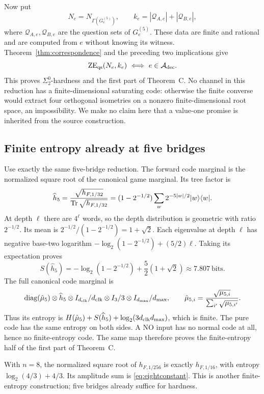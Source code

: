 Now put
\[
 N_e=N_{\Gamma(G_e^{(5)})},\qquad
 k_e=|\mathcal Q_{A,e}|+|\mathcal Q_{B,e}|,
\]
where $\mathcal Q_{A,e},\mathcal Q_{B,e}$ are the question sets of $G^{(5)}_e$. These data are finite and rational and are computed from $e$ without knowing its witness. Theorem~\ref{thm:correspondence} and the preceding two implications give
\[
 \mathrm{ZE}_{\mathrm{qs}}(N_e,k_e)\ \Longleftrightarrow\ e\in \mathcal A_{\rm dec}.
\]
This proves $\Sigma^0_2$-hardness and the first part of Theorem~C. No channel in this reduction has a finite-dimensional saturating code: otherwise the finite converse would extract four orthogonal isometries on a nonzero finite-dimensional root space, an impossibility. We make no claim here that a value-one promise is inherited from the source construction.

\subsection{Finite entropy already at five bridges}\label{sec:finiteentropy}
Use exactly the same five-bridge reduction. The forward code marginal is the normalized square root of the canonical game marginal. Its tree factor is
\[
 \widehat h_5=\frac{\sqrt{h_{F,1/32}}}{\operatorname{Tr}\sqrt{h_{F,1/32}}}
 =(1-2^{-1/2})\sum_w2^{-5|w|/2}|w\rangle\langle w|.
\]
At depth $\ell$ there are $4^\ell$ words, so the depth distribution is geometric with ratio $2^{-1/2}$. Its mean is $2^{-1/2}/(1-2^{-1/2})=1+\sqrt2$. Each eigenvalue at depth $\ell$ has negative base-two logarithm $-\log_2(1-2^{-1/2})+(5/2)\ell$. Taking its expectation proves
\begin{equation}\label{eq:fiveentropy}
 S(\widehat h_5)=-\log_2(1-2^{-1/2})+\frac52(1+\sqrt2)
 \approx 7.807\ \text{bits}.
\end{equation}
The full canonical code marginal is
\[
 \operatorname{diag}(\hat\mu_5)\otimes\widehat h_5
 \otimes I_{{d_{\rm clk}}}/{d_{\rm clk}}\otimes I_3/3\otimes I_{d_{\max}}/d_{\max},
 \qquad \hat\mu_{5,i}=\frac{\sqrt{\mu_{5,i}}}{\sum_{i'}\sqrt{\mu_{5,i'}}}.
\]
Thus its entropy is $H(\hat\mu_5)+S(\widehat h_5)+\log_2(3{d_{\rm clk}}d_{\max})$, which is finite. The pure code has the same entropy on both sides. A NO input has no normal code at all, hence no finite-entropy code. The same map therefore proves the finite-entropy half of the first part of Theorem~C.

\begin{remark}
With $n=8$, the normalized square root of $h_{F,1/256}$ is exactly $h_{F,1/16}$, with entropy $\log_2(4/3)+4/3$. Its amplitude sum is \eqref{eq:eightconstant}. This is another finite-entropy construction; five bridges already suffice for hardness.
\end{remark}

